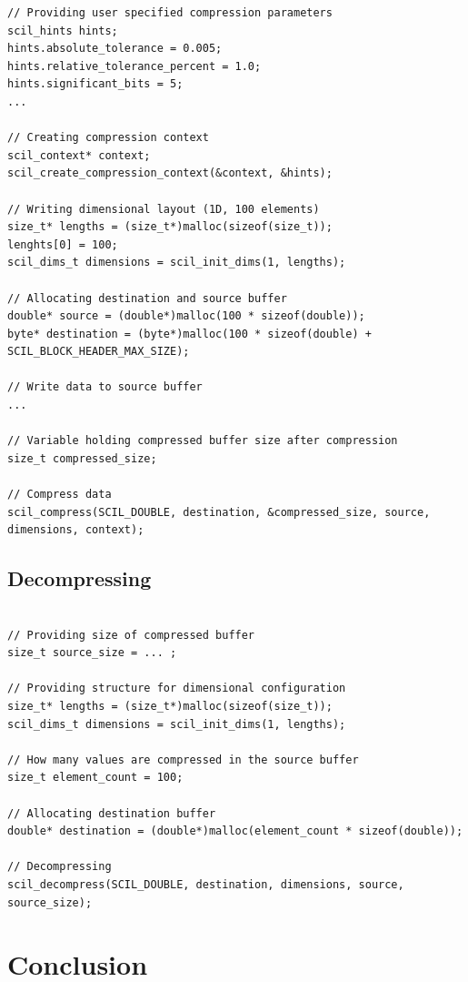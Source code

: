 \documentclass[
	12pt,
	a4paper,
	BCOR10mm,
	DIV14,
	headsepline,
]{scrreprt}
\begin{document}
\begin{lstlisting}[caption=Compression with SCIL, label={lst:comp}]
// Providing user specified compression parameters
scil_hints hints;
hints.absolute_tolerance = 0.005;
hints.relative_tolerance_percent = 1.0;
hints.significant_bits = 5;
...

// Creating compression context
scil_context* context;
scil_create_compression_context(&context, &hints);

// Writing dimensional layout (1D, 100 elements)
size_t* lengths = (size_t*)malloc(sizeof(size_t));
lenghts[0] = 100;
scil_dims_t dimensions = scil_init_dims(1, lengths);

// Allocating destination and source buffer
double* source = (double*)malloc(100 * sizeof(double));
byte* destination = (byte*)malloc(100 * sizeof(double) + SCIL_BLOCK_HEADER_MAX_SIZE);

// Write data to source buffer
...

// Variable holding compressed buffer size after compression
size_t compressed_size;

// Compress data
scil_compress(SCIL_DOUBLE, destination, &compressed_size, source, dimensions, context);
\end{lstlisting}

\clearpage

\section{Decompressing}

\bigskip

\begin{lstlisting}[caption=Decompression with SCIL, label={lst:decomp}]

// Providing size of compressed buffer
size_t source_size = ... ;

// Providing structure for dimensional configuration
size_t* lengths = (size_t*)malloc(sizeof(size_t));
scil_dims_t dimensions = scil_init_dims(1, lengths);

// How many values are compressed in the source buffer
size_t element_count = 100;

// Allocating destination buffer
double* destination = (double*)malloc(element_count * sizeof(double));

// Decompressing
scil_decompress(SCIL_DOUBLE, destination, dimensions, source, source_size);
\end{lstlisting}

\chapter{Conclusion}
\label{Conclusion}
\end{document}
